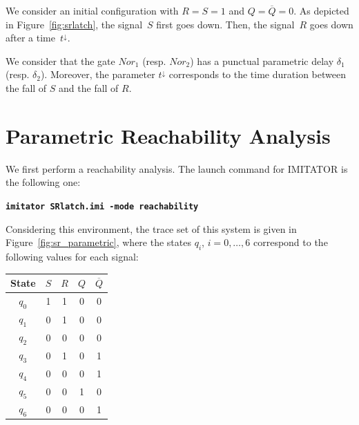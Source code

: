 \documentclass[a4paper,11pt]{report}
\newcommand{\imitator}{\textsf{IMITATOR}}
\newcommand{\imitatorExec}{\code{imitator}}
\newcommand{\code}[1]{\textbf{\texttt{#1}}}
\begin{document}
\medskip

We consider an initial configuration with $R = S = 1$ and $Q = \overline{Q} = 0$.
As depicted in Figure~\ref{fig:srlatch}, the signal~$S$ first goes down.
Then, the signal~$R$ goes down after a time~$t^\downarrow$.


We consider that the gate $\mathit{Nor}_1$ (resp. $\mathit{Nor}_2$) has a punctual parametric delay $\delta_1$ (resp. $\delta_2$).
Moreover, the parameter $t^\downarrow$ corresponds to the time duration between the fall of $S$ and the fall of $R$.


\section{Parametric Reachability Analysis}

We first perform a reachability analysis.
The launch command for \imitator{} is the following one:

\code{\imitatorExec{} SRlatch.imi -mode reachability}

Considering this environment, the trace set of this system is given in Figure~\ref{fig:sr_parametric}, where the states $q_i$, $i = 0, \dots, 6$ correspond to the following values for each signal:

\smallskip

{

\centering

\begin{tabular}{|c||c|c|c|c|}
	\hline
	State & $S$ & $R$ & $Q$ & $\overline{Q}$ \\
	\hline
	$q_0$ & 1 & 1 & 0 & 0 \\
	\hline
	$q_1$ & 0 & 1 & 0 & 0 \\
	\hline
	$q_2$ & 0 & 0 & 0 & 0 \\
	\hline
	$q_3$ & 0 & 1 & 0 & 1 \\
	\hline
	$q_4$ & 0 & 0 & 0 & 1 \\
	\hline
	$q_5$ & 0 & 0 & 1 & 0 \\
	\hline
	$q_6$ & 0 & 0 & 0 & 1 \\
	\hline
\end{tabular}

}

\medskip
\end{document}
